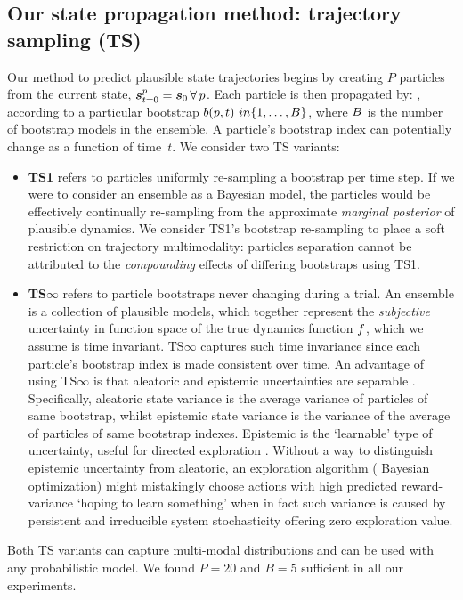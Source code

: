 \subsecspacepre
\subsection{Our state propagation method: trajectory sampling (TS)}
\label{sec:propagation-ts}
\subsecspacepost

Our method to predict plausible state trajectories begins by creating $P$ particles from the current state, $\boldsymbol{s}_{t=0}^{p} = \boldsymbol{s}_0 \,\forall\, p$. 
Each particle is then propagated by:
,
according to a particular bootstrap $b(p,t) \ in \{1, \dots, B\}$,
where $B$ is the number of bootstrap models in the ensemble.
% 
A particle's bootstrap index can potentially change as a function of time~$t$. 
We consider two TS variants:
\begin{itemize}[leftmargin=15pt]
 \item \textbf{TS1} refers to particles uniformly re-sampling a bootstrap per time step.
If we were to consider an ensemble as a Bayesian model, the particles would be effectively continually re-sampling from the approximate \textit{marginal posterior} of plausible dynamics.
We consider TS1's bootstrap re-sampling to place a soft restriction on trajectory multimodality: 
particles separation cannot be attributed to the \textit{compounding} effects of differing bootstraps using TS1.
%
 \item \textbf{TS$\infty$} refers to particle bootstraps never changing during a trial.
An ensemble is a collection of plausible models, which together represent the \textit{subjective} uncertainty in function space of the true dynamics function $f$, which we assume is time invariant. 
TS$\infty$ captures such time invariance since each particle's bootstrap index is made consistent over time.
An advantage of using TS$\infty$ is that aleatoric and epistemic uncertainties are separable \citep{depeweg2018decomposition}. 
Specifically, aleatoric state variance is the average variance of particles of same bootstrap, whilst epistemic state variance is the variance of the average of particles of same bootstrap indexes.
Epistemic is the `learnable' type of uncertainty, useful for directed exploration \citep{thrun1992efficient}.
Without a way to distinguish epistemic uncertainty from aleatoric, an exploration algorithm (\eg{} Bayesian optimization) might mistakingly choose actions with high predicted reward-variance `hoping to learn something' when in fact such variance is caused by persistent and irreducible system stochasticity offering zero exploration value.
\end{itemize}
%
Both TS variants can capture multi-modal distributions and can be used with any probabilistic model. We found $P=20$ and $B=5$ sufficient in all our experiments.


